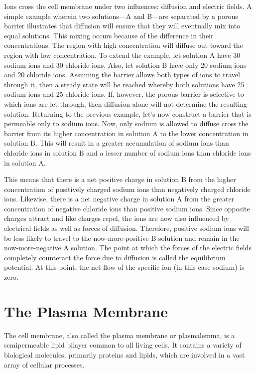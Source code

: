 Ions cross the cell membrane under two influences: diffusion and electric fields. A simple example wherein two solutions---A and B---are separated by a porous barrier illustrates that diffusion will ensure that they will eventually mix into equal solutions. This mixing occurs because of the difference in their concentrations. The region with high concentration will diffuse out toward the region with low concentration. To extend the example, let solution A have 30 sodium ions and 30 chloride ions. Also, let solution B have only 20 sodium ions and 20 chloride ions. Assuming the barrier allows both types of ions to travel through it, then a steady state will be reached whereby both solutions have 25 sodium ions and 25 chloride ions. If, however, the porous barrier is selective to which ions are let through, then diffusion alone will not determine the resulting solution. Returning to the previous example, let's now construct a barrier that is permeable only to sodium ions. Now, only sodium is allowed to diffuse cross the barrier from its higher concentration in solution A to the lower concentration in solution B. This will result in a greater accumulation of sodium ions than chloride ions in solution B and a lesser number of sodium ions than chloride ions in solution A.

This means that there is a net positive charge in solution B from the higher concentration of positively charged sodium ions than negatively charged chloride ions. Likewise, there is a net negative charge in solution A from the greater concentration of negative chloride ions than positive sodium ions. Since opposite charges attract and like charges repel, the ions are now also influenced by electrical fields as well as forces of diffusion. Therefore, positive sodium ions will be less likely to travel to the now-more-positive B solution and remain in the now-more-negative A solution. The point at which the forces of the electric fields completely counteract the force due to diffusion is called the equilibrium potential. At this point, the net flow of the specific ion (in this case sodium) is zero.

\hypertarget{the-plasma-membrane}{%
\section{The Plasma Membrane}\label{the-plasma-membrane}}

The cell membrane, also called the plasma membrane or plasmalemma, is a semipermeable lipid bilayer common to all living cells. It contains a variety of biological molecules, primarily proteins and lipids, which are involved in a vast array of cellular processes.



